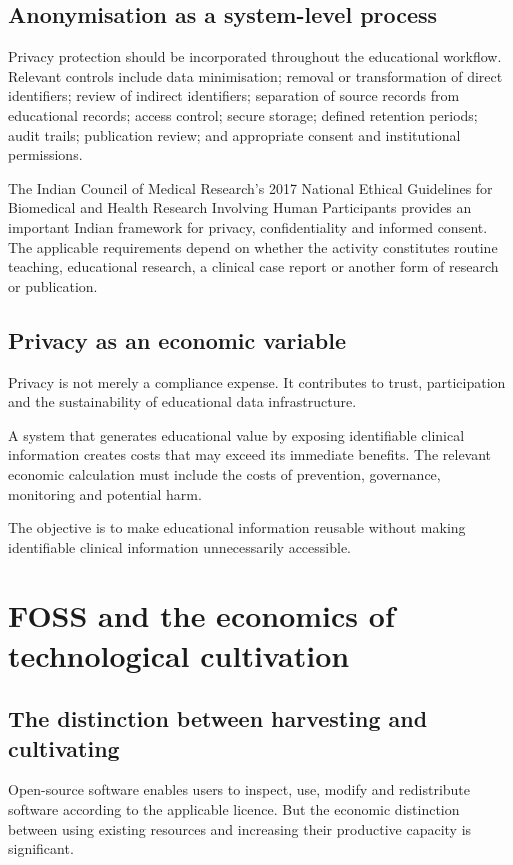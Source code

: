 \documentclass[11pt,a4paper]{article}
\begin{document}
\subsection{Anonymisation as a system-level process}
Privacy protection should be incorporated throughout the educational workflow. Relevant controls include data minimisation; removal or transformation of direct identifiers; review of indirect identifiers; separation of source records from educational records; access control; secure storage; defined retention periods; audit trails; publication review; and appropriate consent and institutional permissions.

The Indian Council of Medical Research's 2017 National Ethical Guidelines for Biomedical and Health Research Involving Human Participants provides an important Indian framework for privacy, confidentiality and informed consent. The applicable requirements depend on whether the activity constitutes routine teaching, educational research, a clinical case report or another form of research or publication.

\subsection{Privacy as an economic variable}
Privacy is not merely a compliance expense. It contributes to trust, participation and the sustainability of educational data infrastructure.

A system that generates educational value by exposing identifiable clinical information creates costs that may exceed its immediate benefits. The relevant economic calculation must include the costs of prevention, governance, monitoring and potential harm.

The objective is to make educational information reusable without making identifiable clinical information unnecessarily accessible.

\section{FOSS and the economics of technological cultivation}
\subsection{The distinction between harvesting and cultivating}
Open-source software enables users to inspect, use, modify and redistribute software according to the applicable licence. But the economic distinction between using existing resources and increasing their productive capacity is significant.
\end{document}
